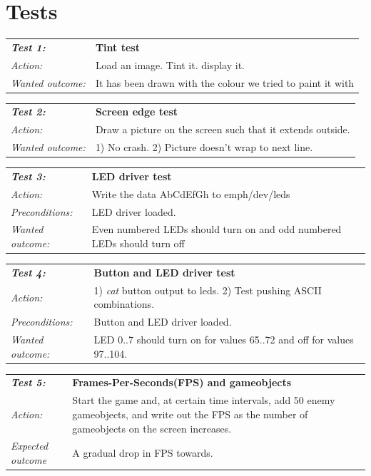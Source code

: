 \documentclass[a4paper,12pt]{article}
\begin{document}
\clearpage
\appendix
{}
\section{Tests}

\begin{tabular}[h]{|lp{12cm}|} \hline
\textbf{\emph{Test 1:}} 	& \textbf{Tint test}\\
\emph{Action:} 		& Load an image. Tint it. display it.\\
\emph{Wanted outcome:}	& It has been drawn with the colour we tried to paint it with \\ \hline
\end{tabular}
\vspace{1cm}

\begin{tabular}[h]{|lp{12cm}|} \hline
\textbf{\emph{Test 2:}} 	& \textbf{Screen edge test}\\
\emph{Action:} 		& Draw a picture on the screen such that it extends outside.\\
\emph{Wanted outcome:}	& 1) No crash. 2) Picture doesn’t wrap to next line. \\ \hline
\end{tabular}
\vspace{1cm}

\begin{tabular}[h]{|lp{12cm}|} \hline
\textbf{\emph{Test 3:}} 	& \textbf{LED driver test}\\
\emph{Action:} 		& Write the data AbCdEfGh to emph{/dev/leds} \\
\emph{Preconditions:}	& LED driver loaded.\\
\emph{Wanted outcome:}	& Even numbered LEDs should turn on and odd numbered LEDs should turn off \\ \hline
\end{tabular}
\vspace{1cm}

\begin{tabular}[h]{|lp{12cm}|} \hline
\textbf{\emph{Test 4:}} 	& \textbf{Button and LED driver test}\\
\emph{Action:} 		& 1) \emph{cat} button output to leds. 2) Test pushing ASCII combinations.\\
\emph{Preconditions:}	& Button and LED driver loaded.\\
\emph{Wanted outcome:}	& LED 0..7 should turn on for values 65..72 and off for values 97..104.\\ \hline
\end{tabular}
\vspace{1cm}

\begin{tabular}[h]{|lp{12cm}|} \hline
\textbf{\emph{Test 5:}} 	& \textbf{Frames-Per-Seconds(FPS) and gameobjects}\\
\emph{Action:} 		& Start the game and, at certain time intervals, add 50 enemy gameobjects, and write out the FPS as the number of gameobjects on the screen increases.\\
\emph{Expected outcome}	& A gradual drop in FPS towards.  \\ \hline
\end{tabular}
\vspace{1cm}
\end{document}
